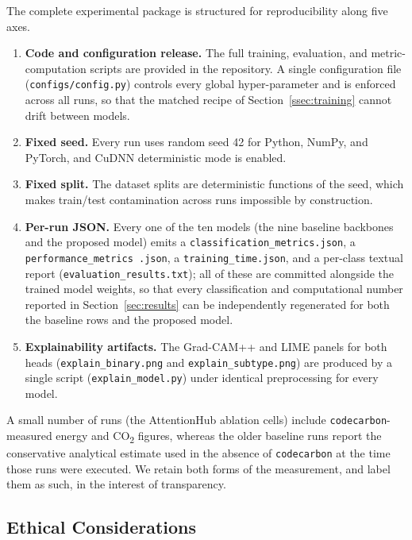 The complete experimental package is structured for reproducibility along
five axes.

\begin{enumerate}
  \item \textbf{Code and configuration release.} The full training,
  evaluation, and metric-computation scripts are provided in the
  repository. A single configuration file (\texttt{configs/config.py})
  controls every global hyper-parameter and is enforced across all runs, so
  that the matched recipe of Section~\ref{ssec:training} cannot drift
  between models.
  \item \textbf{Fixed seed.} Every run uses random seed 42 for Python,
  NumPy, and PyTorch, and CuDNN deterministic mode is enabled.
  \item \textbf{Fixed split.} The dataset splits are deterministic functions
  of the seed, which makes train/test contamination across runs impossible
  by construction.
  \item \textbf{Per-run JSON.} Every one of the ten models (the nine
  baseline backbones and the proposed model) emits a
  \texttt{classification\_metrics.json}, a \texttt{performance\_metrics%
  .json}, a \texttt{training\_time.json}, and a per-class textual report
  (\texttt{evaluation\_results.txt}); all of these are committed alongside
  the trained model weights, so that every classification and computational
  number reported in Section~\ref{sec:results} can be independently
  regenerated for both the baseline rows and the proposed model.
  \item \textbf{Explainability artifacts.} The Grad-CAM++ and LIME panels for
  both heads (\texttt{explain\_binary.png} and
  \texttt{explain\_subtype.png}) are produced by a single script
  (\texttt{explain\_model.py}) under identical preprocessing for every
  model.
\end{enumerate}

A small number of runs (the AttentionHub ablation cells) include
\texttt{codecarbon}-measured energy and CO\textsubscript{2} figures, whereas
the older baseline runs report the conservative analytical estimate used in
the absence of \texttt{codecarbon} at the time those runs were executed. We
retain both forms of the measurement, and label them as such, in the
interest of transparency.

\subsection{Ethical Considerations}\label{ssec:ethics}

